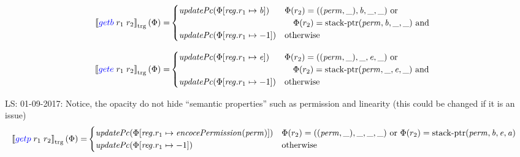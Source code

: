 \documentclass[a4paper]{article}
\newcommand\lau[1]{{\color{purple} \sf \footnotesize {LS: #1}}\\}
\newcommand{\sem}[1]{\left\llbracket #1 \right\rrbracket}
\newcommand{\tsem}[2][\Phi]{\sem{#2}_{\mathrm{trg}}(#1)}
\newcommand{\tand}{\text{ and }}
\newcommand{\totherwise}{\text{otherwise }}
\newcommand{\sourcecolor}[1]{\color{blue}}
\newcommand{\src}[1]{{\sourcecolor{} #1}}
\newcommand{\zinstr}[1]{#1}
\newcommand{\twoinstr}[3]{
  \ifthenelse{\equal{#2#3}{}}
  {\zinstr{#1}}
  {\zinstr{#1} \; #2 \; #3}
}
\newcommand{\sgetb}[2]{\twoinstr{\src{getb}}{#1}{#2}}
\newcommand{\sgete}[2]{\twoinstr{\src{gete}}{#1}{#2}}
\newcommand{\sgetp}[2]{\twoinstr{\src{getp}}{#1}{#2}}
\newcommand{\update}[2]{[#1 \mapsto #2]}
\newcommand{\updReg}[2]{\update{\reg.#1}{#2}}
\newcommand{\perm}{\var{perm}}
\newcommand{\stkptr}[1]{\mathrm{stack\text{-}ptr}(#1)}
\newcommand{\var}[1]{\mathit{#1}}
\newcommand{\reg}{\var{reg}}
\newcommand{\baddr}{\var{b}}
\newcommand{\eaddr}{\var{e}}
\newcommand{\aaddr}{\var{a}}
\newcommand{\plainfun}[2]{
  \ifthenelse{\equal{#2}{}}
  {\mathit{#1}}
  {\mathit{#1}(#2)}
}
\newcommand{\encPerm}[1]{\plainfun{encocePermission}{#1}}
\newcommand{\updPcAddr}[1]{\plainfun{updatePc}{#1}}
\begin{document}
\begin{align*}
  \tsem{\sgetb{r_1}{r_2}} = &
                              \begin{cases}
                                \updPcAddr{\Phi\update{\reg.r_1}{\baddr}} & 
                                \arraycolsep=0pt
                                \begin{array}[t]{l}
                                  \Phi(r_2) = ((\perm,\_),\baddr,\_,\_) \text{ or } \\
                                  \quad \Phi(r_2) = \stkptr{\perm,\baddr,\_,\_} \tand\\
                                \end{array} \\
                                \updPcAddr{\Phi\updReg{r_1}{-1}} & \totherwise
                              \end{cases}
\end{align*}

\begin{align*}
  \tsem{\sgete{r_1}{r_2}} = &
                              \begin{cases}
                                \updPcAddr{\Phi\update{\reg.r_1}{\eaddr}} & 
                                \arraycolsep=0pt
                                \begin{array}[t]{l}
                                  \Phi(r_2) = ((\perm,\_),\_,\eaddr,\_) \text{ or } \\
                                  \quad \Phi(r_2) = \stkptr{\perm,\_,\eaddr,\_} \tand\\
                                \end{array} \\
                                \updPcAddr{\Phi\updReg{r_1}{-1}} & \totherwise
                              \end{cases}
\end{align*}

\lau{01-09-2017: Notice, the opacity do not hide ``semantic properties'' such as permission and linearity (this could be changed if it is an issue)}

\begin{align*}
  \tsem{\sgetp{r_1}{r_2}} = & 
                              \begin{cases}
                                \updPcAddr{}(\Phi\update{\reg.r_1}{\encPerm{\perm}}) & \Phi(r_2) = ((\perm,\_),\_,\_,\_) \text{ or } \Phi(r_2) = \stkptr{\perm,\baddr,\eaddr,\aaddr}\\
                                \updPcAddr{\Phi\updReg{r_1}{-1}} & \totherwise
                              \end{cases}
\end{align*}
\end{document}
